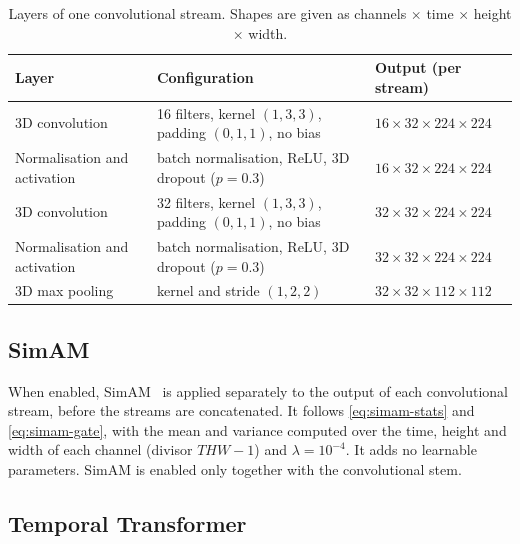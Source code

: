 \begin{table}[htbp]
	\centering
	\small
	\begin{tabular}{@{}l l l@{}}
		\hline
		\textbf{Layer} & \textbf{Configuration} & \textbf{Output (per stream)} \\
		\hline
		3D convolution          & 16 filters, kernel $(1,3,3)$, padding $(0,1,1)$, no bias & $16\times32\times224\times224$ \\
		Normalisation and activation & batch normalisation, ReLU, 3D dropout ($p=0.3$) & $16\times32\times224\times224$ \\
		3D convolution          & 32 filters, kernel $(1,3,3)$, padding $(0,1,1)$, no bias & $32\times32\times224\times224$ \\
		Normalisation and activation & batch normalisation, ReLU, 3D dropout ($p=0.3$) & $32\times32\times224\times224$ \\
		3D max pooling          & kernel and stride $(1,2,2)$ & $32\times32\times112\times112$ \\
		\hline
	\end{tabular}
	\caption[Layers of one convolutional stream]{Layers of one convolutional stream. Shapes are given as channels $\times$ time $\times$ height $\times$ width.}
	\label{tab:conv-stem}
\end{table}

\subsection{SimAM}
\label{sec:simam-placement}

When enabled, SimAM~\cite{yang2021} is applied separately to the output of each convolutional stream, before the streams are concatenated. It follows \eqref{eq:simam-stats} and \eqref{eq:simam-gate}, with the mean and variance computed over the time, height and width of each channel (divisor $THW-1$) and $\lambda = 10^{-4}$. It adds no learnable parameters. SimAM is enabled only together with the convolutional stem.

\subsection{Temporal Transformer}
\label{sec:transformer-config}

